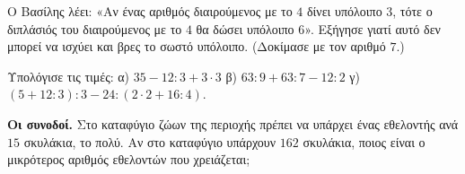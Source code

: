 \ex Ο Βασίλης λέει: «Αν ένας αριθμός διαιρούμενος με το $4$ δίνει υπόλοιπο $3$, τότε ο διπλάσιός του διαιρούμενος με το $4$ θα δώσει υπόλοιπο $6$». Εξήγησε γιατί αυτό δεν μπορεί να ισχύει και βρες το σωστό υπόλοιπο. (Δοκίμασε με τον αριθμό $7$.)


\ex Υπολόγισε τις τιμές: α) $35-12:3+3\cdot 3$ \quad β) $63:9+63:7-12:2$ \quad γ) $(5+12:3):3-24:(2\cdot 2+16:4)$.

\ex \textbf{Οι συνοδοί.} Στο καταφύγιο ζώων της περιοχής πρέπει να υπάρχει ένας εθελοντής ανά $15$ σκυλάκια, το πολύ. Αν στο καταφύγιο υπάρχουν $162$ σκυλάκια, ποιος είναι ο μικρότερος αριθμός εθελοντών που χρειάζεται;
